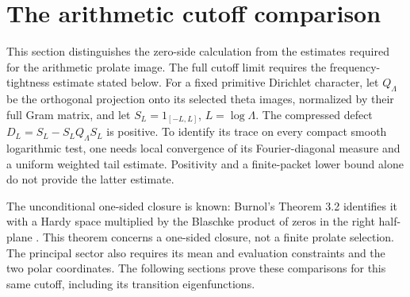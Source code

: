 \section{The arithmetic cutoff comparison}
This section distinguishes the zero-side calculation from
the estimates required for the arithmetic prolate image. The full
cutoff limit requires the frequency-tightness estimate stated below.
For a fixed primitive Dirichlet character, let $Q_\Lambda$ be the
orthogonal projection onto its selected theta images, normalized by
their full Gram matrix, and let $S_L=1_{[-L,L]}$, $L=\log\Lambda$.
The compressed defect $D_L=S_L-S_LQ_\Lambda S_L$ is positive.
To identify its trace on every compact smooth logarithmic test,
one needs local convergence of its Fourier-diagonal measure and a
uniform weighted tail estimate. Positivity and a finite-packet lower
bound alone do not provide the latter estimate.

The unconditional one-sided closure is known: Burnol's
Theorem 3.2 identifies it with a Hardy space multiplied by the
Blaschke product of zeros in the right half-plane
\citep[pp.~14--15]{burnol2000}. This theorem concerns a one-sided
closure, not a finite prolate selection. The principal sector also
requires its mean and evaluation constraints and the two polar
coordinates. The following sections prove these comparisons for
this same cutoff, including its transition eigenfunctions.
